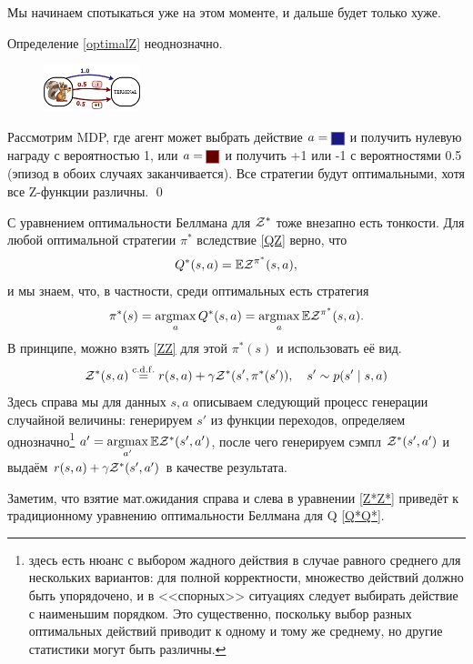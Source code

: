 Мы начинаем спотыкаться уже на этом моменте, и дальше будет только хуже.

\begin{theorem}
Определение \eqref{optimalZ} неоднозначно.

\begin{figure}
\vspace{-1cm}
\centering
\includegraphics[width=0.25\textwidth]{Images/optimalZissue.png}
\end{figure}
\beginproof
Рассмотрим MDP, где агент может выбрать действие $a \HM= \colorsquare{ChadBlue}$ и получить нулевую награду с вероятностью 1, или $a \HM = \colorsquare{ChadRed}$ и получить +1 или -1 с вероятностями 0.5 (эпизод в обоих случаях заканчивается). Все стратегии будут оптимальными, хотя все Z-функции различны. \qed
\end{theorem}

С уравнением оптимальности Беллмана для $\mathcal{Z}^*$ тоже внезапно есть тонкости. Для любой оптимальной стратегии  $\pi^*$ вследствие \eqref{QZ} верно, что
$$Q^*(s, a) = \mathbb{E} \mathcal{Z}^{\pi^*}(s, a),$$
и мы знаем, что, в частности, среди оптимальных есть стратегия
$$\pi^*(s) = \mathop{\mathrm{argmax}}\limits_a Q^*(s, a) = \mathop{\mathrm{argmax}}\limits_a \mathbb{E} \mathcal{Z}^{\pi^*}(s, a).$$
В принципе, можно взять \eqref{ZZ} для этой $\pi^*(s)$ и использовать её вид.
\begin{equation}\label{Z*Z*}
\mathcal{Z}^*(s, a) \mathrel{\stackrel{\mathrm{c.d.f.}}=} r(s, a) + \gamma \mathcal{Z}^*(s', \pi^*(s')), \quad s' \sim p(s' \mid s, a)
\end{equation}
Здесь справа мы для данных $s, a$ описываем следующий процесс генерации случайной величины: генерируем $s'$ из функции переходов, определяем однозначно\footnote{здесь есть нюанс с выбором жадного действия в случае равного среднего для нескольких вариантов: для полной корректности, множество действий должно быть упорядочено, и в <<спорных>> ситуациях следует выбирать действие с наименьшим порядком. Это существенно, поскольку выбор разных оптимальных действий приводит к одному и тому же среднему, но другие статистики могут быть различны.} $a' = \mathop{\mathrm{argmax}}\limits_{a'} \mathbb{E} \mathcal{Z}^*(s', a')$, после чего генерируем сэмпл $\mathcal{Z}^*(s', a')$ и выдаём $r(s, a) + \gamma \mathcal{Z}^*(s', a')$ в качестве результата.

Заметим, что взятие мат.ожидания справа и слева в уравнении \eqref{Z*Z*} приведёт к традиционному уравнению оптимальности Беллмана для Q \eqref{Q*Q*}.

